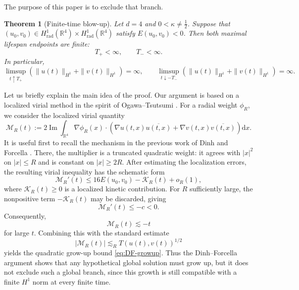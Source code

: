 \documentclass[12pt]{amsart}
\numberwithin{equation}{section}
\newtheorem{theorem}{Theorem}[section]
\theoremstyle{remark}
\newcommand{\R}{\mathbb{R}}
\newcommand{\dd}{\mathrm{d}x}
\newcommand{\im}{\operatorname{Im}}
\begin{document}
The purpose of this paper is to exclude that branch.

\begin{theorem}[Finite-time blow-up]\label{thm:main}
Let $d=4$ and $0<\kappa\neq\frac12$.  Suppose that $(u_0,v_0)\in H^1_{\mathrm{rad}}(\R^4)\times H^1_{\mathrm{rad}}(\R^4)$ satisfy $E(u_0,v_0)<0$. Then both maximal lifespan endpoints are finite:
\[
 T_+<\infty,\qquad T_-<\infty.
\]
In particular,
\[
\limsup_{t\uparrow T_+} (\|u(t)\|_{H^1} + \|v(t)\|_{H^1}) = \infty, \qquad \limsup_{t\downarrow -T_-}(\|u(t)\|_{H^1}+\|v(t)\|_{H^1})=\infty.
\]
\end{theorem}


Let us briefly explain the main idea of the proof. Our argument is based on a localized virial method in the spirit of Ogawa--Tsutsumi \cite{OT}. For a radial weight $\phi_R$, we consider the localized virial quantity
\begin{equation*}
\mathcal M_R(t):= 2\im\int_{\mathbb R^4} \nabla\phi_R(x)\cdot \left(\nabla u(t,x)\overline{u(t,x)}+\nabla v(t,x)\overline{v(t,x)}\right)\dd.
\end{equation*}
It is useful first to recall the mechanism in the previous work of Dinh and Forcella \cite{DF}. There, the multiplier is a truncated quadratic weight: it agrees with $|x|^2$ on $|x|\le R$ and is constant on $|x|\ge 2R$. After estimating the localization errors, the resulting virial inequality has the schematic form
\[
\mathcal M_R'(t) \le 16E(u_0,v_0)-\mathcal K_R(t)+o_R(1),
\]
where $\mathcal K_R(t)\ge0$ is a localized kinetic contribution. For $R$ sufficiently large, the nonpositive term $-\mathcal K_R(t)$ may be discarded, giving
\[
\mathcal M_R'(t)\le -c<0.
\]
Consequently,
\[
\mathcal M_R(t)\lesssim -t
\]
for large $t$. Combining this with the standard estimate
\[
|\mathcal M_R(t)|\lesssim_R T(u(t),v(t))^{1/2}
\]
yields the quadratic grow-up bound \eqref{eq:DF-growup}. Thus the Dinh--Forcella argument shows that any hypothetical global solution must grow up, but it does not exclude such a global branch, since this growth is still compatible with a finite $H^1$ norm at every finite time.
\end{document}

